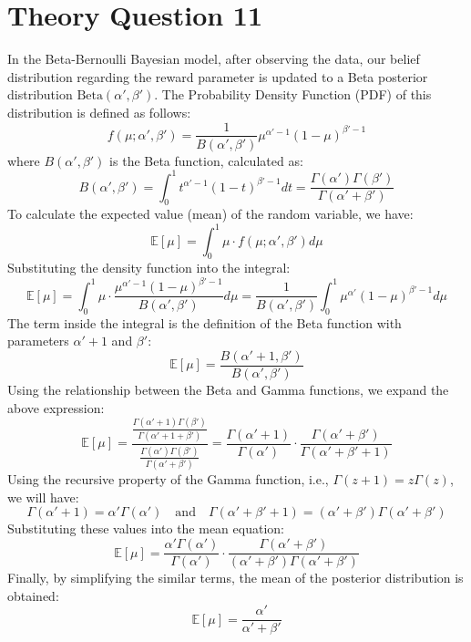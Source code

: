 \documentclass[12pt,a4paper]{article}
\begin{document}
\section*{Theory Question 11} %
In the Beta-Bernoulli Bayesian model, after observing the data, our belief distribution regarding the reward parameter is updated to a Beta posterior distribution $\mathrm{Beta}(\alpha', \beta')$.
The Probability Density Function (PDF) of this distribution is defined as follows: %
\[ 
f(\mu; \alpha', \beta') = \frac{1}{B(\alpha', \beta')} \mu^{\alpha'-1}(1-\mu)^{\beta'-1} 
\] %
where $B(\alpha', \beta')$ is the Beta function, calculated as: %
\[ 
B(\alpha', \beta') = \int_{0}^{1} t^{\alpha'-1}(1-t)^{\beta'-1} dt = \frac{\Gamma(\alpha')\Gamma(\beta')}{\Gamma(\alpha'+\beta')} 
\] %
To calculate the expected value (mean) of the random variable, we have: %
\[ 
\mathbb{E}[\mu] = \int_{0}^{1} \mu \cdot f(\mu; \alpha', \beta') d\mu 
\] %
Substituting the density function into the integral: %
\[ 
\mathbb{E}[\mu] = \int_{0}^{1} \mu \cdot \frac{\mu^{\alpha'-1}(1-\mu)^{\beta'-1}}{B(\alpha', \beta')} d\mu = \frac{1}{B(\alpha', \beta')} \int_{0}^{1} \mu^{\alpha'}(1-\mu)^{\beta'-1} d\mu 
\] %
The term inside the integral is the definition of the Beta function with parameters $\alpha'+1$ and $\beta'$: %
\[ 
\mathbb{E}[\mu] = \frac{B(\alpha'+1, \beta')}{B(\alpha', \beta')} 
\] %
Using the relationship between the Beta and Gamma functions, we expand the above expression: %
\[ 
\mathbb{E}[\mu] = \frac{\frac{\Gamma(\alpha'+1)\Gamma(\beta')}{\Gamma(\alpha'+1+\beta')}}{\frac{\Gamma(\alpha')\Gamma(\beta')}{\Gamma(\alpha'+\beta')}} = \frac{\Gamma(\alpha'+1)}{\Gamma(\alpha')} \cdot \frac{\Gamma(\alpha'+\beta')}{\Gamma(\alpha'+\beta'+1)} 
\] %
Using the recursive property of the Gamma function, i.e., $\Gamma(z+1) = z\Gamma(z)$, we will have: %
\[ 
\Gamma(\alpha'+1) = \alpha'\Gamma(\alpha') \quad \text{and} \quad \Gamma(\alpha'+\beta'+1) = (\alpha'+\beta')\Gamma(\alpha'+\beta') 
\] %
Substituting these values into the mean equation: %
\[ 
\mathbb{E}[\mu] = \frac{\alpha'\Gamma(\alpha')}{\Gamma(\alpha')} \cdot \frac{\Gamma(\alpha'+\beta')}{(\alpha'+\beta')\Gamma(\alpha'+\beta')} 
\] %
Finally, by simplifying the similar terms, the mean of the posterior distribution is obtained: %
\[ 
\mathbb{E}[\mu] = \frac{\alpha'}{\alpha'+\beta'} 
\] %
\end{document}
